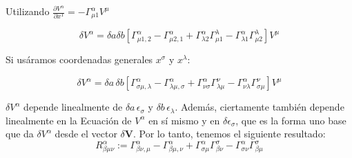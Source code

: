 \documentclass{article}
\begin{document}
Utilizando $\frac{\partial V^\alpha}{\partial x^1} = - \Gamma^\alpha_{\mu 1} V^\mu$

\[
\delta V^\alpha = \delta a \delta b \left[ \Gamma^\alpha_{\mu 1, 2} - \Gamma^\alpha_{\mu 2, 1} + \Gamma^\alpha_{\lambda 2} \Gamma^\lambda_{\mu 1} - \Gamma^\alpha_{\lambda 1} \Gamma^\lambda_{\mu 2} \right] V^\mu
\]


Si usáramos coordenadas generales $x^\sigma$ y $x^\lambda$:

\[
\delta V^\alpha = \delta a \, \delta b \left[ \Gamma^\alpha_{\sigma \mu, \lambda} - \Gamma^\alpha_{\lambda \mu, \sigma} + \Gamma^\alpha_{\nu \sigma} \Gamma^\nu_{\lambda \mu} - \Gamma^\alpha_{\nu \lambda} \Gamma^\nu_{\sigma \mu} \right] V^\mu
\]

$\delta V^\alpha$ depende linealmente de $\delta a \, \epsilon_\sigma$ y $\delta b \, \epsilon_\lambda$. 
Además, ciertamente también depende linealmente en la Ecuación de $V^\alpha$ en sí mismo y en $\delta \epsilon_\sigma$, que es la forma uno base que da $\delta V^\alpha$ desde el vector $\delta \mathbf{V}$. 
Por lo tanto, tenemos el siguiente resultado:
\[
R^\alpha_{\beta \mu \nu} := \Gamma^\alpha_{\beta \nu, \mu} - \Gamma^\alpha_{\beta \mu, \nu} + \Gamma^\alpha_{\sigma \mu} \Gamma^\sigma_{\beta \nu} - \Gamma^\alpha_{\sigma \nu} \Gamma^\sigma_{\beta \mu}
\]

\hfill 

\hfill 

\hfill 
\end{document}
